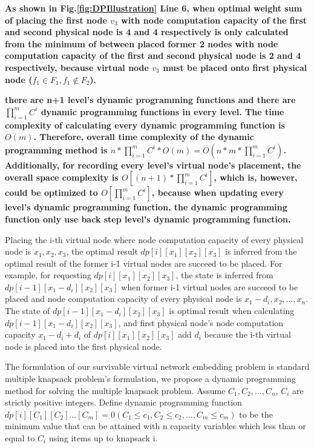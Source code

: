 \textbf{
As shown in Fig.\ref{fig:DPIllustration} Line 6, when optimal weight sum of placing the first node $v_3$ with node computation capacity of the first and second physical node is 4 and 4 respectively is only calculated from the minimum of between placed former 2 nodes with node computation capacity of the first and second physical node is 2 and 4 respectively, because virtual node $v_3$ must be placed onto first physical node ($f_1\in F_1,f_1\notin F_2$).
}

\textbf{there are n+1 level's dynamic programming functions and there are $\prod_{i=1}^{m}C^i$ dynamic programming functions in every level. The time complexity of calculating every dynamic programming function is $O(m)$. Therefore, overall time complexity of the dynamic programming method is $n*\prod_{i=1}^{m}C^i*O(m)=O(n*m*\prod_{i=1}^{m}C^i)$. Additionally, for recording every level's virtual node's placement, the overall space complexity is $O[(n+1)*\prod_{i=1}^{m}C^i]$, which is, however, could be optimized to $O[\prod_{i=1}^{m}C^i]$, because when updating every level's dynamic programming function, the dynamic programming function only use back step level's dynamic programming function.}


Placing the i-th virtual node where node computation capacity of every physical node is $x_1,x_2,x_3$, the optimal result $dp[i][{x_1}][{x_2}][{x_3}]$ is inferred from the optimal result of the former i-1 virtual nodes are succeed to be placed. For example, for requesting $dp[i][{x_1}][{x_2}][{x_3}]$, the state is inferred from $dp[i-1][{x_1-d_i}][{x_2}][{x_3}]$ when former i-1 virtual nodes are succeed to be placed and node computation capacity of every physical node is $x_1-d_i,x_2,\ldots,x_n$. The state of $dp[i-1][{x_1-d_i}][{x_2}][{x_3}]$ is optimal result when calculating $dp[i-1][{x_1-d_i}][{x_2}][{x_3}]$, and first physical node's node computation capacity $x_1-d_i+d_i$  of $dp[i][{x_1}][{x_2}][{x_3}]$ add $d_i$ because the i-th virtual node is placed into the first physical node.


The formulation of our survivable virtual network embedding problem is standard multiple knapsack problem's formulation, we propose a dynamic programming method for solving the multiple knapsack problem. Assume $C_1,C_2,\ldots,C_n$, $C_i$ are strictly positive integers. Define dynamic programming function $dp[i][{C_1}][{C_2}] \ldots [{C_m}]=0(C_1\leq c_1,C_2\leq c_2,\ldots,C_m\leq c_m)$ to be the minimum value that can be attained with n capacity variables  which less than or equal to $C_i$ using items up to knapsack i.


